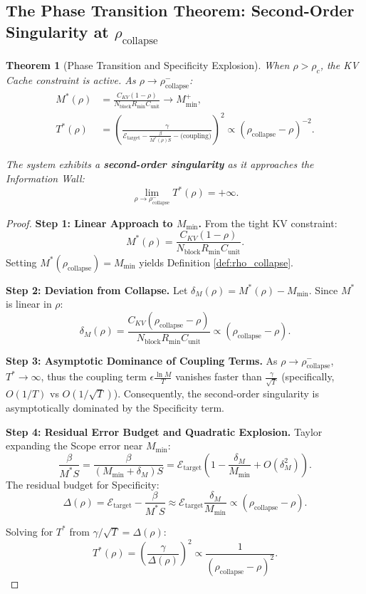 \documentclass[11pt,a4paper]{article}
\theoremstyle{plain}
\newtheorem{theorem}{Theorem}[section]
\theoremstyle{definition}
\theoremstyle{remark}
\begin{document}
\subsection{The Phase Transition Theorem: Second-Order Singularity at $\rho_{\text{collapse}}$}

\begin{theorem}[Phase Transition and Specificity Explosion]\label{thm:phase_transition}
When $\rho > \rho_c$, the KV Cache constraint is active. As $\rho \to \rho_{\text{collapse}}^-$:
\begin{align}
M^*(\rho) &= \frac{C_{KV}(1-\rho)}{N_{\text{block}} R_{\min} C_{\text{unit}}} \to M_{\min}^+, \label{eq:M_linear}\\
T^*(\rho) &= \left(\frac{\gamma}{\mathcal{E}_{\text{target}} - \frac{\beta}{M^*(\rho) S} - \text{(coupling)}}\right)^2 \propto (\rho_{\text{collapse}} - \rho)^{-2}. \label{eq:T_quadratic}
\end{align}

The system exhibits a \textbf{second-order singularity} as it approaches the Information Wall:
\begin{equation}
    \lim_{\rho \to \rho_{\text{collapse}}^-} T^*(\rho) = +\infty.
\end{equation}
\end{theorem}

\begin{proof}
\textbf{Step 1: Linear Approach to $M_{\min}$.} From the tight KV constraint:
$$ M^*(\rho) = \frac{C_{KV}(1-\rho)}{N_{\text{block}} R_{\min} C_{\text{unit}}}. $$
Setting $M^*(\rho_{\text{collapse}}) = M_{\min}$ yields Definition \ref{def:rho_collapse}.

\textbf{Step 2: Deviation from Collapse.} Let $\delta_M(\rho) = M^*(\rho) - M_{\min}$. Since $M^*$ is linear in $\rho$:
$$ \delta_M(\rho) = \frac{C_{KV}(\rho_{\text{collapse}} - \rho)}{N_{\text{block}} R_{\min} C_{\text{unit}}} \propto (\rho_{\text{collapse}} - \rho). $$

\textbf{Step 3: Asymptotic Dominance of Coupling Terms.} As $\rho \to \rho_{\text{collapse}}^-$, $T^* \to \infty$, thus the coupling term $\epsilon \frac{\ln M}{T}$ vanishes faster than $\frac{\gamma}{\sqrt{T}}$ (specifically, $O(1/T)$ vs $O(1/\sqrt{T})$). Consequently, the second-order singularity is asymptotically dominated by the Specificity term.

\textbf{Step 4: Residual Error Budget and Quadratic Explosion.} Taylor expanding the Scope error near $M_{\min}$:
$$ \frac{\beta}{M^* S} = \frac{\beta}{(M_{\min} + \delta_M)S} = \mathcal{E}_{\text{target}} \left(1 - \frac{\delta_M}{M_{\min}} + O(\delta_M^2)\right). $$
The residual budget for Specificity:
$$ \Delta(\rho) = \mathcal{E}_{\text{target}} - \frac{\beta}{M^* S} \approx \mathcal{E}_{\text{target}} \frac{\delta_M}{M_{\min}} \propto (\rho_{\text{collapse}} - \rho). $$

Solving for $T^*$ from $\gamma/\sqrt{T} = \Delta(\rho)$:
$$ T^*(\rho) = \left(\frac{\gamma}{\Delta(\rho)}\right)^2 \propto \frac{1}{(\rho_{\text{collapse}} - \rho)^2}. $$
\end{proof}
\end{document}
